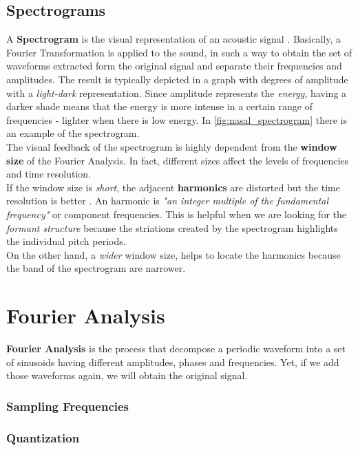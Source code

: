 \subsection{Spectrograms}
\label{sec:spectrograms}
A \textbf{Spectrogram} is the visual representation of an acoustic signal \cite{spectrogram_def}. Basically, a Fourier Transformation is applied to the sound, in such a way to obtain the set of waveforms extracted form the original signal and separate their frequencies and amplitudes. The result is typically depicted in a graph with degrees of amplitude with a \textit{light-dark} representation. Since amplitude represents the \textit{energy}, having a darker shade means that the energy is more intense in a certain range of frequencies - lighter when there is low energy. In \ref{fig:nasal_spectrogram} there is an example of the spectrogram. \\
\noindent The visual feedback of the spectrogram is highly dependent from the \textbf{window size} of the Fourier Analysis. In fact, different sizes affect the levels of frequencies and time resolution. \\
\noindent If the window size is \textit{short}, the adjacent \textbf{harmonics} are distorted but the time resolution is better \cite{spectrogram_def}. An harmonic is \textit{"an integer multiple of the fundamental frequency"}\cite{harmonic_wiki} or component frequencies. This is helpful when we are looking for the \textit{formant structure} because the striations created by the spectrogram highlights the individual pitch periods. \\
\noindent On the other hand, a \textit{wider} window size, helps to locate the harmonics because the band of the spectrogram are narrower.


\section{Fourier Analysis}
\label{sec:fourier_analysis}
\textbf{Fourier Analysis} is the process that decompose a periodic waveform into a set of sinusoids having different amplitudes, phases and frequencies. Yet, if we add those waveforms again, we will obtain the original signal.


\subsubsection{Sampling Frequencies}
\label{ssubs:sampling_frequencies}


\subsubsection{Quantization}
\label{subs:quantization}


